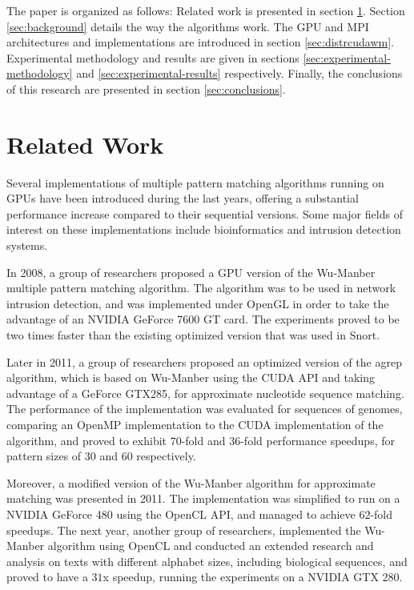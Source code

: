\documentclass{ws-ijait}
\begin{document}
The paper is organized as follows: Related work is presented in section \ref{sec:related-work}. Section \ref{sec:background} details the way the algorithms work. The GPU and MPI architectures and implementations are introduced in section \ref{sec:distrcudawm}. Experimental methodology and results are given in sections \ref{sec:experimental-methodology} and \ref{sec:experimental-results} respectively. Finally, the conclusions of this research are presented in section \ref{sec:conclusions}.

\section{Related Work}
\label{sec:related-work}

Several implementations of multiple pattern matching algorithms running on GPUs have been introduced during the last years, offering a substantial performance increase compared to their sequential versions. Some major fields of interest on these implementations include bioinformatics and intrusion detection systems.

In 2008, a group of researchers proposed a GPU version of the Wu-Manber multiple pattern matching algorithm.\cite{Huang2008} The algorithm was to be used in network intrusion detection, and was implemented under OpenGL in order to take the advantage of an NVIDIA GeForce 7600 GT card. The experiments proved to be two times faster than the existing optimized version that was used in Snort.\cite{SnortWeb}

Later in 2011,\cite{Hongjian2011} a group of researchers proposed an optimized version of the agrep algorithm,\cite{Wu1992} which is based on Wu-Manber using the CUDA API and taking advantage of a GeForce GTX285, for approximate nucleotide sequence matching. The performance of the implementation was evaluated for sequences of genomes, comparing an OpenMP implementation to the CUDA implementation of the algorithm, and proved to exhibit $70$-fold and $36$-fold performance speedups, for pattern sizes of $30$ and $60$ respectively.

Moreover, a modified version of the Wu-Manber algorithm for approximate matching was presented in 2011.\cite{tran2011} The implementation was simplified to run on a NVIDIA GeForce 480 using the OpenCL API, and managed to achieve $62$-fold speedups. The next year, another group of researchers,\cite{pyrgiotis2012parallel} implemented the Wu-Manber algorithm using OpenCL and conducted an extended research and analysis on texts with different alphabet sizes, including biological sequences, and proved to have a $31$x speedup, running the experiments on a NVIDIA GTX 280.
\end{document}
